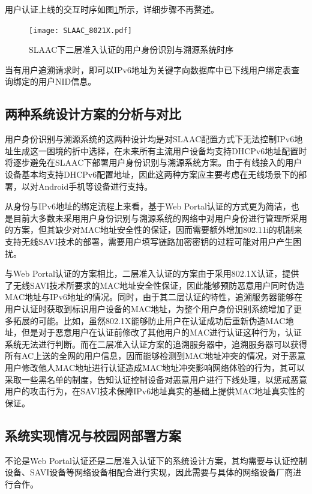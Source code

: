     用户认证上线的交互时序如图\ref{fig:SLAAC_802.1X}所示，详细步骤不再赘述。

    \begin{figure}[ht]
      \centering
      \texttt{[image: SLAAC\_8021X.pdf]}
      \caption{SLAAC下二层准入认证的用户身份识别与溯源系统时序}
      \label{fig:SLAAC_802.1X}
    \end{figure}

    当有用户追溯请求时，即可以IPv6地址为关键字向数据库中已下线用户绑定表查询绑定的用户NID信息。

    \subsection{两种系统设计方案的分析与对比}
    \label{NIDTGA:SLAAC:comparison}
    用户身份识别与溯源系统的这两种设计均是对SLAAC配置方式下无法控制IPv6地址生成这一困境的折中选择，在未来所有主流用户设备均支持DHCPv6地址配置时将逐步避免在SLAAC下部署用户身份识别与溯源系统方案。由于有线接入的用户设备基本均支持DHCPv6配置地址，因此这两种方案应主要考虑在无线场景下的部署，以对Android手机等设备进行支持。

    从身份与IPv6地址的绑定流程上来看，基于Web Portal认证的方式更为简洁，也是目前大多数未采用用户身份识别与溯源系统的网络中对用户身份进行管理所采用的方案，但其缺少对MAC地址安全性的保证，因而需要额外增加802.11i的机制来支持无线SAVI技术的部署，需要用户填写链路加密密钥的过程可能对用户产生困扰。

    与Web Portal认证的方案相比，二层准入认证的方案由于采用802.1X认证，提供了无线SAVI技术所要求的MAC地址安全性保证，因此能够预防恶意用户同时伪造MAC地址与IPv6地址的情况。同时，由于其二层认证的特性，追溯服务器能够在用户认证时获取到标识用户设备的MAC地址，为整个用户身份识别系统增加了更多拓展的可能。比如，虽然802.1X能够防止用户在认证成功后重新伪造MAC地址，但是对于恶意用户在认证前修改了其他用户的MAC进行认证这种行为，认证系统无法进行判断。而在二层准入认证方案的追溯服务器中，追溯服务器可以获得所有AC上送的全网的用户信息，因而能够检测到MAC地址冲突的情况，对于恶意用户修改他人MAC地址进行认证造成MAC地址冲突影响网络体验的行为，其可以采取一些黑名单的制度，告知认证控制设备对恶意用户进行下线处理，以惩戒恶意用户的攻击行为，在SAVI技术保障IPv6地址真实的基础上提供MAC地址真实性的保证。

    \subsection{系统实现情况与校园网部署方案}
    \label{NIDTGA:SLAAC:deploy}
    不论是Web Portal认证还是二层准入认证下的系统设计方案，其均需要与认证控制设备、SAVI设备等网络设备相配合进行实现，因此需要与具体的网络设备厂商进行合作。

